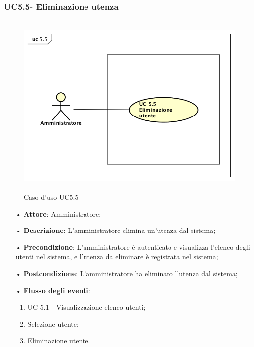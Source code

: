 \subsubsection{UC5.5- Eliminazione utenza}
\begin{figure}[H]
\centering
\includegraphics[width=17cm, height=9cm]{img/UC55.png} 
\caption{Caso d'uso UC5.5}
\end{figure}
\begin{itemize}
\item[•] \textbf{Attore}: Amministratore;

\item[•] \textbf{Descrizione}: L’amministratore elimina un’utenza dal sistema;

\item[•] \textbf{Precondizione}: L’amministratore \`{e} autenticato e visualizza l’elenco degli utenti nel sistema, e l’utenza da eliminare \`{e} registrata nel sistema;

\item[•] \textbf{Postcondizione}: L'amministratore ha eliminato l'utenza dal sistema; 

\item[•] \textbf{Flusso degli eventi}:

\begin{enumerate}

\item UC 5.1 - Visualizzazione elenco utenti;

\item Selezione utente;

\item Eliminazione utente.

\end{enumerate}

\end{itemize}
